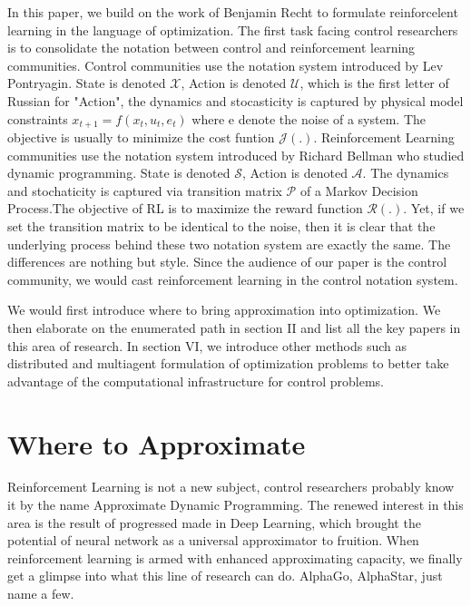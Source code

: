 \documentclass[journal]{IEEEtran}
\begin{document}
In this paper, we build on the work of Benjamin Recht \cite{Recht2018ATO} to formulate reinforcelent learning in the language of optimization. The first task facing control researchers is to consolidate the notation between control and reinforcement learning communities. Control communities use the notation system introduced by Lev Pontryagin. State is denoted $ \mathcal{X}$, Action is denoted $\mathcal{U}$, which is the first letter of Russian for "Action", the dynamics and stocasticity is captured by physical model constraints $x_{t+1}=f(x_t,u_t,e_t)$ where e denote the noise of a system. The objective is usually to minimize the cost funtion $\mathcal{J(.)}$. Reinforcement Learning communities use the notation system introduced by Richard Bellman who studied dynamic programming. State is denoted $\mathcal{S}$, Action is denoted $\mathcal{A}$. The dynamics and stochaticity is captured via transition matrix $\mathcal{P}$ of a Markov Decision Process.The objective of RL is to maximize the reward function $\mathcal{R(.)}$. Yet, if we set the transition matrix to be identical to the noise, then it is clear that the underlying process behind these two notation system are exactly the same. The differences are nothing but style. Since the audience of our paper is the control community, we would cast reinforcement learning in the control notation system.

We would first introduce where to bring approximation into optimization. We then elaborate on the enumerated path in section II and list all the key papers in this area of research. In section VI, we introduce other methods such as distributed and multiagent formulation of optimization problems to better take advantage of the computational infrastructure for control problems.
\section{Where to Approximate}
Reinforcement Learning is not a new subject, control researchers probably know it by the name Approximate Dynamic Programming. The renewed interest in this area is the result of progressed made in Deep Learning, which brought the potential of neural network as a universal approximator \cite{Hornik1991ApproximationCO} to fruition. When reinforcement learning is armed with enhanced approximating capacity, we finally get a glimpse into what this line of research can do. AlphaGo, AlphaStar, just name a few.
\end{document}
